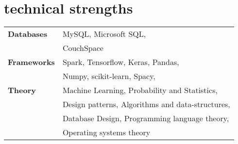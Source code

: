 \documentclass[]{friggeri-cv} %
\begin{document}
\section{technical strengths}


\begin{tabular}{p{3cm} l}
	\textbf{Databases} & MySQL, Microsoft SQL, \\
					   & CouchSpace \\
	\textbf{Frameworks} & Spark, Tensorflow, Keras, Pandas, \\
						& Numpy, scikit-learn, Spacy, \\
	\textbf{Theory} & Machine Learning, Probability and Statistics, \\
					& Design patterns, Algorithms and data-structures, \\
					& Database Design, Programming language theory, \\ 
					& Operating systems theory

\end{tabular}





\end{document}
